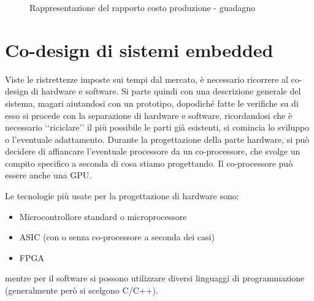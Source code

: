 \documentclass[10pt,a4paper,oneside]{scrbook}
\begin{document}
\begin{figure}
	\centering
	\caption{Rappresentazione del rapporto costo produzione - guadagno}
	\label{img:time-to-market}
\end{figure}

\section{Co-design di sistemi embedded}
Viste le ristrettezze imposte sui tempi dal mercato, è necessario ricorrere al co-design di hardware e software.
Si parte quindi con una descrizione generale del sistema, magari aiutandosi con un prototipo, dopodiché fatte le verifiche su di esso si procede con la separazione di
hardware e software, ricordandosi che è necessario ‘‘riciclare’’ il più possibile le parti già esistenti, si comincia lo sviluppo o l'eventuale adattamento.
Durante la progettazione della parte hardware, si può decidere di affiancare l'eventuale processore da un co-processore, che svolge un compito
specifico a seconda di cosa stiamo progettando. Il co-processore può essere anche una GPU.

Le tecnologie più usate per la progettazione di hardware sono:
\begin{itemize}
	\item Microcontrollore standard o microprocessore
	\item ASIC (con o senza co-processore a seconda dei casi)
	\item FPGA
\end{itemize}
mentre per il software si possono utilizzare diversi linguaggi di programmazione (generalmente però si scelgono C/C++).
\end{document}
